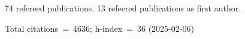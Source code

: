 74 refereed publications. 13 refeered publications as first author.

Total citations~=~4636; h-index~=~36 (2025-02-06)